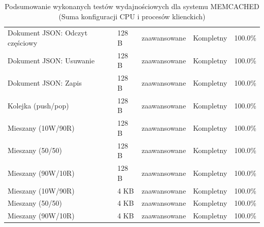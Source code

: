 \begin{table}[ht]
{\begin{tabular}{lllcc}
Dokument JSON: Odczyt częściowy & 128 B & zaawansowane & Kompletny & 100.0\% \\
Dokument JSON: Usuwanie & 128 B & zaawansowane & Kompletny & 100.0\% \\
Dokument JSON: Zapis & 128 B & zaawansowane & Kompletny & 100.0\% \\
Kolejka (push/pop) & 128 B & zaawansowane & Kompletny & 100.0\% \\
Mieszany (10W/90R) & 128 B & zaawansowane & Kompletny & 100.0\% \\
Mieszany (50/50) & 128 B & zaawansowane & Kompletny & 100.0\% \\
Mieszany (90W/10R) & 128 B & zaawansowane & Kompletny & 100.0\% \\
Mieszany (10W/90R) & 4 KB & zaawansowane & Kompletny & 100.0\% \\
Mieszany (50/50) & 4 KB & zaawansowane & Kompletny & 100.0\% \\
Mieszany (90W/10R) & 4 KB & zaawansowane & Kompletny & 100.0\% \\
\bottomrule
\end{tabular}%
}
\caption{Podsumowanie wykonanych testów wydajnościowych dla systemu MEMCACHED (Suma konfiguracji CPU i procesów klienckich)}
\label{tab:executed_tests_memcached}
\end{table}
